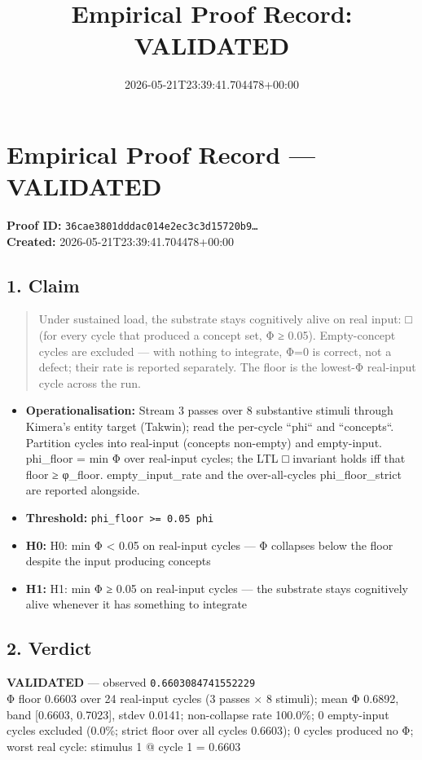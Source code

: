 \documentclass{article}
\title{Empirical Proof Record: VALIDATED}
\date{2026-05-21T23:39:41.704478+00:00}
\begin{document}
\maketitle
\section*{Empirical Proof Record --- \textcolor{validated}{\textbf{VALIDATED}}}
\textbf{Proof ID:} \texttt{36cae3801dddac014e2ec3c3d15720b9\dots}\\
\textbf{Created:} 2026-05-21T23:39:41.704478+00:00
\subsection*{1. Claim}
\begin{quote}Under sustained load, the substrate stays cognitively alive on real input: □ (for every cycle that produced a concept set, Φ ≥ 0.05). Empty-concept cycles are excluded — with nothing to integrate, Φ=0 is correct, not a defect; their rate is reported separately. The floor is the lowest-Φ real-input cycle across the run.\end{quote}
\begin{itemize}
\item \textbf{Operationalisation:} Stream 3 passes over 8 substantive stimuli through Kimera's entity target (Takwin); read the per-cycle ``phi`` and ``concepts``. Partition cycles into real-input (concepts non-empty) and empty-input. phi\_floor = min Φ over real-input cycles; the LTL □ invariant holds iff that floor ≥ φ\_floor. empty\_input\_rate and the over-all-cycles phi\_floor\_strict are reported alongside.
\item \textbf{Threshold:} \texttt{phi\_floor >= 0.05 phi}
\item \textbf{H0:} H0: min Φ < 0.05 on real-input cycles — Φ collapses below the floor despite the input producing concepts
\item \textbf{H1:} H1: min Φ ≥ 0.05 on real-input cycles — the substrate stays cognitively alive whenever it has something to integrate
\end{itemize}
\subsection*{2. Verdict}
\textcolor{validated}{\textbf{VALIDATED}} --- observed \texttt{0.6603084741552229}\\
Φ floor 0.6603 over 24 real-input cycles (3 passes × 8 stimuli); mean Φ 0.6892, band [0.6603, 0.7023], stdev 0.0141; non-collapse rate 100.0\%; 0 empty-input cycles excluded (0.0\%; strict floor over all cycles 0.6603); 0 cycles produced no Φ; worst real cycle: stimulus 1 @ cycle 1 = 0.6603
\end{document}
